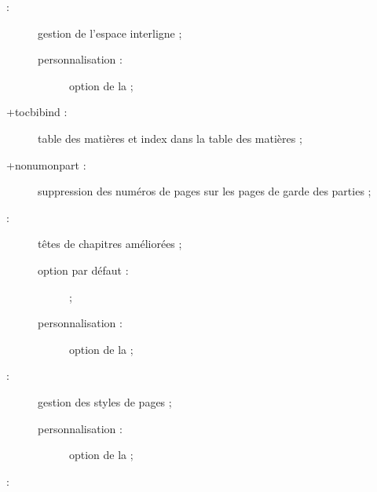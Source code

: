 \begin{description}
\item[ :] gestion de l'espace
  interligne ;
  \begin{description}
  \item[personnalisation :] option  de la \yatCl{} ;
  \end{description}
\item[\package*+{tocbibind} :] table des matières et index dans la table des
  matières ;
\item[\package*+{nonumonpart} :] suppression des numéros de pages sur les pages
  de garde des parties ;
\item[ :] %
  têtes de chapitres améliorées ;
  \begin{description}
  \item[option par défaut :]  ;
  \item[personnalisation :] option  de la \yatCl{} ;
  \end{description}
\item[ :] %
  gestion des styles de pages ;
  \begin{description}
  \item[personnalisation :] option  de la \yatCl{} ;
  \end{description}
\item[ :] %

\end{description}
